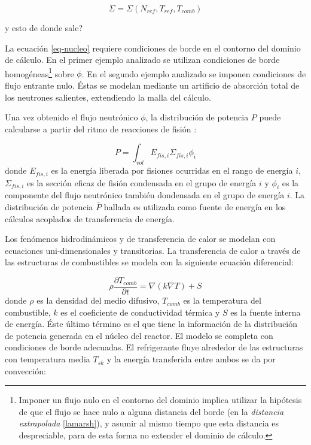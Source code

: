 \begin{equation}
\Sigma = \Sigma \left ( N_{ref}, T_{ref}, T_{comb} \right )
\label{eq-sigma}
\end{equation}

y esto de donde sale?

La ecuación \ref{eq-nucleo} requiere condiciones de borde en el contorno del dominio de cálculo.
En el primer ejemplo analizado se utilizan condiciones de borde homogéneas\footnote{
Imponer un flujo nulo en el contorno del dominio implica utilizar la hipótesis de que el flujo se hace nulo a alguna distancia del borde (en la \textit{distancia extrapolada} \ref{lamarsh}),
y asumir al mismo tiempo que esta distancia es despreciable, para de esta forma no extender el dominio de cálculo.
} sobre $\phi$.
En el segundo ejemplo analizado se imponen condiciones de flujo entrante nulo.
Éstas se modelan mediante un artificio de absorción total de los neutrones salientes, extendiendo la malla del cálculo.

Una vez obtenido el flujo neutrónico $\phi$,
la distribución de potencia $P$ puede calcularse a partir del ritmo de reacciones de fisión \cite{lamarsh}:

\begin{equation}
P = \int_{vol} E_{fis,i} \Sigma_{fis,i} \phi_{i}
\label{power}
\end{equation}
donde $E_{fis,i}$ es la energía liberada por fisiones ocurridas en el rango de energía $i$,
$\Sigma_{fis,i}$ es la sección eficaz de fisión condensada en el grupo de energía $i$ y
$\phi_{i}$ es la componente del flujo neutrónico también dondensada en el grupo de energía $i$.
La distribución de potencia $\bar{P}$ hallada es utilizada como fuente de energía en los cálculos acoplados de transferencia de energía.

Los fenómenos hidrodinámicos y de transferencia de calor se modelan con ecuaciones uni-dimensionales y transitorias.
La transferencia de calor a través de las estructuras de combustibles se modela con la siguiente ecuación diferencial:

\begin{equation}
\rho \frac{\partial T_{comb}}{\partial t} = \nabla \left ( k \nabla T \right )  + S
\label{relap-calor}
\end{equation}
donde $\rho$ es la densidad del medio difusivo,
$T_{comb}$ es la temperatura del combustible,
$k$ es el coeficiente de conductividad térmica y
$S$ es la fuente interna de energía.
Éste último término es el que tiene la información de la distribución de potencia generada en el núcleo del reactor.
El modelo se completa con condiciones de borde adecuadas.
El refrigerante fluye alrededor de las estructuras con temperatura media $T_{sk}$ y la energía transferida entre ambos se da por convección:

